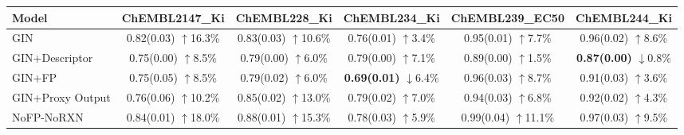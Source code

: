 \begin{table}[t]
\centering
{\small
\setlength{\tabcolsep}{4pt}
\begin{tabular}{l*{5}{c}}
\hline
Model
& ChEMBL2147\_Ki
& ChEMBL228\_Ki
& ChEMBL234\_Ki
& ChEMBL239\_EC50
& ChEMBL244\_Ki \\
\hline
GIN
& \shortstack{0.82(0.03)\\$\uparrow$16.3\%}
& \shortstack{0.83(0.03)\\$\uparrow$10.6\%}
& \shortstack{0.76(0.01)\\$\uparrow$3.4\%}
& \shortstack{0.95(0.01)\\$\uparrow$7.7\%}
& \shortstack{0.96(0.02)\\$\uparrow$8.6\%} \\

GIN+Descriptor
& \shortstack{0.75(0.00)\\$\uparrow$8.5\%}
& \shortstack{0.79(0.00)\\$\uparrow$6.0\%}
& \shortstack{0.79(0.00)\\$\uparrow$7.1\%}
& \shortstack{0.89(0.00)\\$\uparrow$1.5\%}
& \shortstack{\textbf{0.87(0.00)}\\$\downarrow$0.8\%} \\

GIN+FP
& \shortstack{0.75(0.05)\\$\uparrow$8.5\%}
& \shortstack{0.79(0.02)\\$\uparrow$6.0\%}
& \shortstack{\textbf{0.69(0.01)}\\$\downarrow$6.4\%}
& \shortstack{0.96(0.03)\\$\uparrow$8.7\%}
& \shortstack{0.91(0.03)\\$\uparrow$3.6\%} \\

GIN+Proxy Output
& \shortstack{0.76(0.06)\\$\uparrow$10.2\%}
& \shortstack{0.85(0.02)\\$\uparrow$13.0\%}
& \shortstack{0.79(0.02)\\$\uparrow$7.0\%}
& \shortstack{0.94(0.03)\\$\uparrow$6.8\%}
& \shortstack{0.92(0.02)\\$\uparrow$4.3\%} \\

NoFP-NoRXN
& \shortstack{0.84(0.01)\\$\uparrow$18.0\%}
& \shortstack{0.88(0.01)\\$\uparrow$15.3\%}
& \shortstack{0.78(0.03)\\$\uparrow$5.9\%}
& \shortstack{0.99(0.04)\\$\uparrow$11.1\%}
& \shortstack{0.97(0.03)\\$\uparrow$9.5\%} \\


\end{tabular}}
\end{table}
